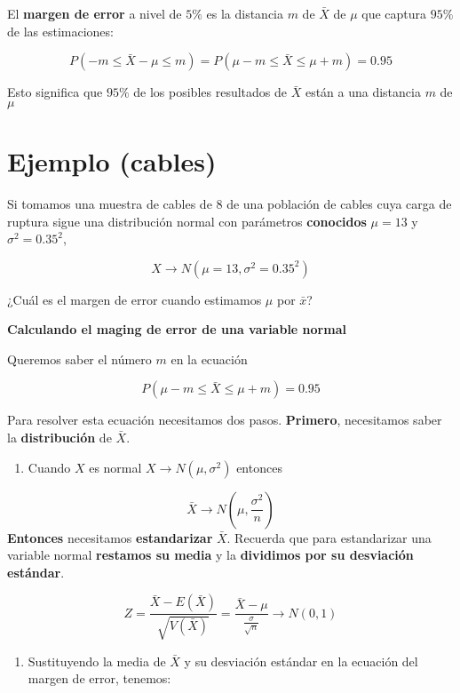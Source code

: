\documentclass[
]{book}
\providecommand{\tightlist}{%
  \setlength{\itemsep}{0pt}\setlength{\parskip}{0pt}}
\begin{document}
El \textbf{margen de error} a nivel de \(5\%\) es la distancia \(m\) de \(\bar{X}\) de \(\mu\) que captura \(95\%\) de las estimaciones:

\[P(-m \leq \bar{X}-\mu \leq m)=P(\mu-m \leq \bar{X} \leq\mu + m)=0.95\]

Esto significa que \(95\%\) de los posibles resultados de \(\bar{X}\) están a una distancia \(m\) de \(\mu\)

\hypertarget{ejemplo-cables}{%
\section{Ejemplo (cables)}\label{ejemplo-cables}}

Si tomamos una muestra de cables de \(8\) de una población de cables cuya carga de ruptura sigue una distribución normal con parámetros \textbf{conocidos} \(\mu=13\) y \(\sigma^2=0.35^2\),

\[X \rightarrow N(\mu=13, \sigma^2=0.35^2)\]

¿Cuál es el margen de error cuando estimamos \(\mu\) por \(\bar{x}\)?

\textbf{Calculando el maging de error de una variable normal}

Queremos saber el número \(m\) en la ecuación

\[P(\mu-m \leq \bar{X} \leq\mu + m)=0.95\]

Para resolver esta ecuación necesitamos dos pasos. \textbf{Primero}, necesitamos saber la \textbf{distribución} de \(\bar{X}\).

\begin{enumerate}
\def\labelenumi{\arabic{enumi}.}
\tightlist
\item
  Cuando \(X\) es normal \(X \rightarrow N(\mu, \sigma^2)\) entonces
\end{enumerate}

\[\bar{X} \rightarrow N(\mu, \frac{\sigma^2}{n})\]
\textbf{Entonces} necesitamos \textbf{estandarizar} \(\bar{X}\). Recuerda que para estandarizar una variable normal \textbf{restamos su media} y la \textbf{dividimos por su desviación estándar}.

\[Z=\frac{\bar{X}-E(\bar{X})}{\sqrt{V(\bar{X})}} =\frac{\bar{X}-\mu}{ \frac{\sigma}{\sqrt{n}}} \rightarrow N(0,1)\]

\begin{enumerate}
\def\labelenumi{\arabic{enumi}.}
\setcounter{enumi}{1}
\tightlist
\item
  Sustituyendo la media de \(\bar{X}\) y su desviación estándar en la ecuación del margen de error, tenemos:
\end{enumerate}
\end{document}
